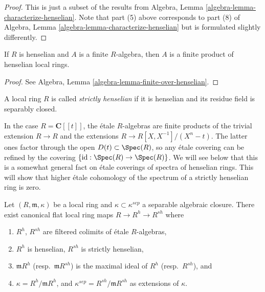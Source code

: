\begin{proof}
This is just a subset of the results from
Algebra, Lemma \ref{algebra-lemma-characterize-henselian}.
Note that part (5) above corresponds to part (8) of
Algebra, Lemma \ref{algebra-lemma-characterize-henselian}
but is formulated slightly differently.
\end{proof}

\begin{lemma}
\label{lemma-finite-over-henselian}
If $R$ is henselian and $A$ is a finite $R$-algebra, then $A$ is a finite
product of henselian local rings.
\end{lemma}

\begin{proof}
See
Algebra, Lemma \ref{algebra-lemma-finite-over-henselian}.
\end{proof}

\begin{definition}
\label{definition-strictly-henselian}
A local ring $R$ is called {\it strictly henselian} if it is henselian and its
residue field is separably closed.
\end{definition}

\begin{example}
\label{example-powerseries}
In the case $R = \mathbf{C}[[t]]$, the \'etale $R$-algebras are finite products
of the trivial extension $R \to R$ and the extensions
$R \to R[X, X^{-1}]/(X^n-t)$.
The latter ones factor through the open $D(t) \subset \Spec(R)$, so any
\'etale covering can be refined by the covering
$\{\text{id} : \Spec(R) \to \Spec(R)\}$. We will see below that
this is a somewhat general fact on \'etale coverings of spectra of henselian
rings. This will show that higher \'etale cohomology of the spectrum of a
strictly henselian ring is zero.
\end{example}

\begin{theorem}
\label{theorem-henselization}
Let $(R, \mathfrak m, \kappa)$ be a local ring and
$\kappa\subset\kappa^{sep}$ a separable algebraic closure.
There exist canonical flat local ring maps $R \to R^h \to R^{sh}$ where
\begin{enumerate}
\item $R^h$, $R^{sh}$ are filtered colimits of \'etale $R$-algebras,
\item $R^h$ is henselian, $R^{sh}$ is strictly henselian,
\item $\mathfrak m R^h$ (resp.\ $\mathfrak m R^{sh}$) is the
maximal ideal of $R^h$ (resp.\ $R^{sh}$), and
\item $\kappa = R^h/\mathfrak m R^h$, and
$\kappa^{sep} = R^{sh}/\mathfrak m R^{sh}$ as extensions of $\kappa$.
\end{enumerate}
\end{theorem}

